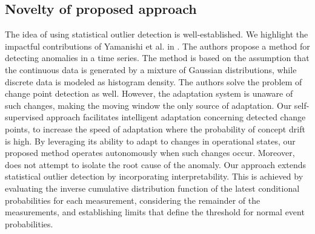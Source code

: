 \subsection{Novelty of proposed approach}
The idea of using statistical outlier detection is well-established. We highlight the impactful contributions of Yamanishi et al. in \citep{Yamanishi2002, Yamanishi2004}. The authors propose a method for detecting anomalies in a time series. The method is based on the assumption that the continuous data is generated by a mixture of Gaussian distributions, while discrete data is modeled as histogram density. The authors solve the problem of change point detection as well. However, the adaptation system is unaware of such changes, making the moving window the only source of adaptation. Our self-supervised approach facilitates intelligent adaptation concerning detected change points, to increase the speed of adaptation where the probability of concept drift is high. By leveraging its ability to adapt to changes in operational states, our proposed method operates autonomously when such changes occur. Moreover, \citet{Yamanishi2004} does not attempt to isolate the root cause of the anomaly. Our approach extends statistical outlier detection by incorporating interpretability. This is achieved by evaluating the inverse cumulative distribution function of the latest conditional probabilities for each measurement, considering the remainder of the measurements, and establishing limits that define the threshold for normal event probabilities.

